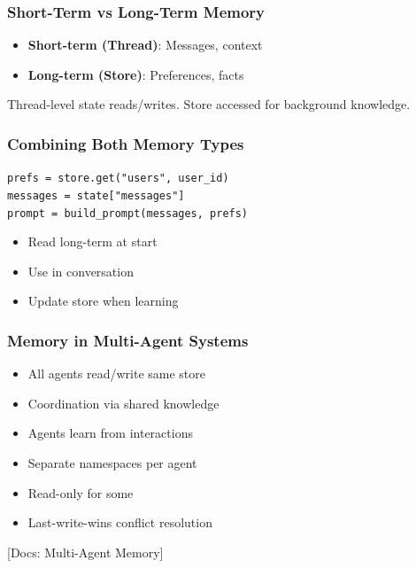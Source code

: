 \documentclass[aspectratio=169,11pt]{beamer}
\newcommand{\docref}[1]{{\scriptsize\color{docgray}[Docs: #1]}}
\begin{document}
\begin{frame}
\frametitle{Short-Term vs Long-Term Memory}
\begin{tipbox}
\setlength{\itemsep}{1pt}
\begin{itemize}
\item \textbf{Short-term (Thread)}: Messages, context
\item \textbf{Long-term (Store)}: Preferences, facts
\end{itemize}
\end{tipbox}
\vspace{0.1cm}
\begin{tipbox}[Interaction]
Thread-level state reads/writes. Store accessed for background knowledge.
\end{tipbox}
\end{frame}

\begin{frame}
\frametitle{Combining Both Memory Types}
\begin{tipbox}
\texttt{prefs = store.get("users", user\_id)}\\
\texttt{messages = state["messages"]}\\
\texttt{prompt = build\_prompt(messages, prefs)}
\end{tipbox}
\vspace{0.1cm}
\begin{tipbox}[Pattern]
\setlength{\itemsep}{1pt}
\begin{itemize}
\item Read long-term at start
\item Use in conversation
\item Update store when learning
\end{itemize}
\end{tipbox}
\end{frame}

\begin{frame}
\frametitle{Memory in Multi-Agent Systems}
\begin{conceptbox}
\setlength{\itemsep}{1pt}
\begin{itemize}
\item All agents read/write same store
\item Coordination via shared knowledge
\item Agents learn from interactions
\end{itemize}
\end{conceptbox}
\vspace{0.1cm}
\begin{warningbox}
\setlength{\itemsep}{1pt}
\begin{itemize}
\item Separate namespaces per agent
\item Read-only for some
\item Last-write-wins conflict resolution
\end{itemize}
\end{warningbox}
\docref{Multi-Agent Memory}
\end{frame}
\end{document}
